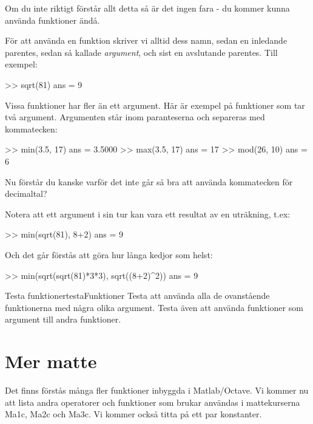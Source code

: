 Om du inte riktigt förstår allt detta så är det ingen fara - du kommer kunna använda funktioner ändå.

För att använda en funktion skriver vi alltid dess namn, sedan en inledande parentes, sedan så kallade \emph{argument}, och sist en avslutande parentes. Till exempel:

\begin{matlab}[caption={Repetition av funktionsanvändning},label={}]
>> sqrt(81)
ans = 9
\end{matlab}

\newpage
Vissa funktioner har fler än ett argument. Här är exempel på funktioner som tar två argument. Argumenten står inom paranteserna och separeras med kommatecken: 
\begin{matlab}[caption={Funktioner med två argument},label={ex:funktionermedtvaargument}]
>> min(3.5, 17) %
ans = 3.5000
>> max(3.5, 17) %
ans = 17
>> mod(26, 10) %
ans = 6
\end{matlab}

Nu förstår du kanske varför det inte går så bra att använda kommatecken för decimaltal?

Notera att ett argument i sin tur kan vara ett resultat av en uträkning, t.ex:

\begin{matlab}[caption={Resultat av uträkning som argument},label={}]
>> min(sqrt(81), 8+2)
ans = 9
\end{matlab}

Och det går förstås att göra hur långa kedjor som helst:

\begin{matlab}[caption={Människor från yttre rymden},label={}]
>> min(sqrt(sqrt(81)*3*3), sqrt((8+2)^2))
ans = 9
\end{matlab}

\begin{matteovning}{Testa funktioner}{testaFunktioner}
Testa att använda alla de ovanstående funktionerna med några olika argument. Testa även att använda funktioner som argument till andra funktioner.
\end{matteovning}


\section{Mer matte}
Det finns förstås många fler funktioner inbyggda i Matlab/Octave. Vi kommer nu att lista andra operatorer och funktioner som brukar användas i mattekurserna Ma1c, Ma2c och Ma3c. Vi kommer också titta på ett par konstanter.

